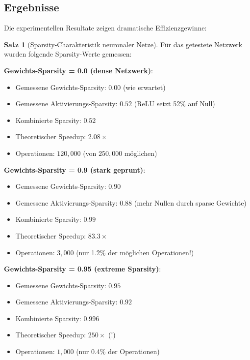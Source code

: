﻿\documentclass[a4paper,12pt]{report}
\theoremstyle{definition}
\newtheorem{satz}{Satz}
\begin{document}
	\subsection{Ergebnisse}
	
	Die experimentellen Resultate zeigen dramatische Effizienzgewinne:
	
	\begin{satz}[Sparsity-Charakteristik neuronaler Netze]
		Für das getestete Netzwerk wurden folgende Sparsity-Werte gemessen:
		
		\textbf{Gewichts-Sparsity = 0.0 (dense Netzwerk)}:
		\begin{itemize}
			\item Gemessene Gewichts-Sparsity: $0.00$ (wie erwartet)
			\item Gemessene Aktivierungs-Sparsity: $0.52$ (ReLU setzt 52\% auf Null)
			\item Kombinierte Sparsity: $0.52$
			\item Theoretischer Speedup: $2.08\times$
			\item Operationen: $120{,}000$ (von $250{,}000$ möglichen)
		\end{itemize}
		
		\textbf{Gewichts-Sparsity = 0.9 (stark geprunt)}:
		\begin{itemize}
			\item Gemessene Gewichts-Sparsity: $0.90$
			\item Gemessene Aktivierungs-Sparsity: $0.88$ (mehr Nullen durch sparse Gewichte)
			\item Kombinierte Sparsity: $0.99$
			\item Theoretischer Speedup: $83.3\times$
			\item Operationen: $3{,}000$ (nur 1.2\% der möglichen Operationen!)
		\end{itemize}
		
		\textbf{Gewichts-Sparsity = 0.95 (extreme Sparsity)}:
		\begin{itemize}
			\item Gemessene Gewichts-Sparsity: $0.95$
			\item Gemessene Aktivierungs-Sparsity: $0.92$
			\item Kombinierte Sparsity: $0.996$
			\item Theoretischer Speedup: $250\times$ (!)
			\item Operationen: $1{,}000$ (nur 0.4\% der Operationen)
		\end{itemize}
	\end{satz}
	
\end{document}
